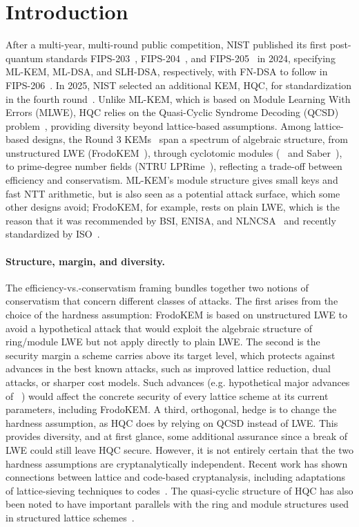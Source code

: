 \section{Introduction}
\label{sec:introduction}
After a multi-year, multi-round public competition, NIST published its first post-quantum standards FIPS-203~\cite{fips203}, FIPS-204~\cite{fips204},
and FIPS-205~\cite{fips205} in 2024, specifying ML-KEM, ML-DSA, and SLH-DSA, respectively, with FN-DSA to follow in FIPS-206~\cite{fips206}.
In 2025, NIST selected an additional KEM, HQC, for standardization in the fourth round~\cite{fourthstatus}. Unlike ML-KEM, which is based on
Module Learning With Errors (MLWE), HQC relies on the Quasi-Cyclic Syndrome Decoding (QCSD) problem~\cite{hqc2025spec}, providing
diversity beyond lattice-based assumptions. Among lattice-based designs, the Round 3 KEMs~\cite{nistpqc-round3} span a spectrum of algebraic
structure, from unstructured LWE (FrodoKEM~\cite{takeofffrodo}), through cyclotomic modules (\kyber~\cite{kyberoriginal} and
Saber~\cite{AFRICACRYPT:DKRV18}), to prime-degree number fields (NTRU LPRime~\cite{ntruprime}), reflecting a trade-off between efficiency
and conservatism. ML-KEM's module structure gives small keys and fast NTT arithmetic, but is also seen as a potential attack surface,
which some other designs avoid; FrodoKEM, for example, rests on plain LWE, which is the reason that it was recommended by BSI, ENISA, and
NLNCSA~\cite{frodokem-news} and recently standardized by ISO~\cite{frodoiso}.

\paragraph{Structure, margin, and diversity.}The efficiency-vs.-conservatism framing bundles together two notions of conservatism that concern different classes of attacks.
The first arises from the choice of the hardness assumption: FrodoKEM is based on unstructured LWE to avoid
a hypothetical attack that would exploit the algebraic structure of ring/module LWE but not apply directly to plain LWE.
The second is the security margin a scheme carries above its target level, which protects against advances in the best known attacks,
such as improved lattice reduction, dual attacks, or sharper cost models. Such advances (e.g. hypothetical major advances of ~\cite{AC:GuoJoh21,matzov2022lwe,C:CMST25,cryptoeprint:2026/2386}) would affect the concrete security of every
lattice scheme at its current parameters, including FrodoKEM.
A third, orthogonal, hedge is to change the hardness 
assumption, as HQC does by relying on QCSD instead of LWE. This provides diversity, and at first glance, some additional assurance
since a break of LWE could still leave HQC secure. However, it is not entirely certain that the two hardness assumptions are cryptanalytically independent.
Recent work has shown connections between lattice and code-based cryptanalysis, 
including adaptations of lattice-sieving techniques to codes~\cite{EC:DEEK24}. The quasi-cyclic structure of HQC has also been noted to 
have important parallels with the ring and module structures used in structured lattice schemes~\cite{hqc-forum}.

